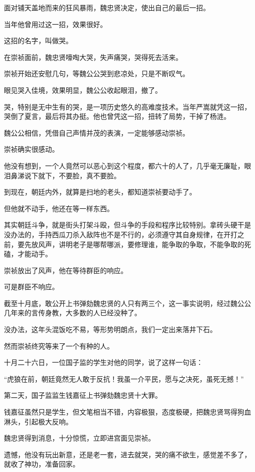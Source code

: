 \begin{multicols}{\theparacolNo}
		面对铺天盖地而来的狂风暴雨，魏忠贤决定，使出自己的最后一招。

		当年他曾用过这一招，效果很好。

		这招的名字，叫做哭。

		在崇祯面前，魏忠贤嚎啕大哭，失声痛哭，哭得死去活来。

		崇祯开始还安慰几句，等魏公公哭到悲凉处，只是不断叹气。

		眼见哭入佳境，效果明显，魏公公收起眼泪，撤了。

		哭，特别是无中生有的哭，是一项历史悠久的高难度技术。当年严嵩就凭这一招，哭倒了夏言，最后将其办挺。他也曾凭这一招，扭转了局势，干掉了杨涟。

		魏公公相信，凭借自己声情并茂的表演，一定能够感动崇祯。

		崇祯确实很感动。

		他没有想到，一个人竟然可以恶心到这个程度，都六十的人了，几乎毫无廉耻，眼泪鼻涕说下就下，不要脸，真不要脸。

		到现在，朝廷内外，就算是扫地的老头，都知道崇祯要动手了。

		但他就不动手，他还在等一样东西。

		其实朝廷斗争，就是街头打架斗殴，但斗争的手段和程序比较特别。拿砖头硬干是没办法的，手持西瓜刀杀入敌阵也不是不行的，必须遵守其自身规律，在开打之前，要先放风声，讲明老子是哪帮哪派，要修理谁，能争取的争取，不能争取的死磕，才能动手。

		崇祯放出了风声，他在等待群臣的响应。

		可是群臣不响应。

		截至十月底，敢公开上书弹劾魏忠贤的人只有两三个，这一事实说明，经过魏公公几年来的言传身教，大多数的人已经没种了。

		没办法，这年头混饭吃不易，等形势明朗点，我们一定出来落井下石。

		然而崇祯终究等来了一个有种的人。

		十月二十六日，一位国子监的学生对他的同学，说了这样一句话：

		“虎狼在前，朝廷竟然无人敢于反抗！我虽一介平民，愿与之决死，虽死无撼！”

		第二天，国子监监生钱嘉征上书弹劾魏忠贤十大罪。

		钱嘉征虽然只是学生，但文笔相当不错，内容极狠，态度极硬，把魏忠贤骂得狗血淋头，引起极大反响。

		魏忠贤得到消息，十分惊慌，立即进宫面见崇祯。

		遗憾，他没有玩出新意，还是老一套，进去就哭，哭的痛不欲生，感觉差不多了，就收了神功，准备回家。


\end{multicols}
